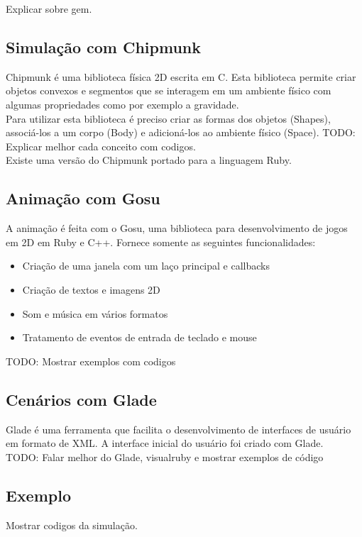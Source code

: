 Explicar sobre gem.

\subsection{Simulação com Chipmunk}
Chipmunk é uma biblioteca física 2D escrita em C. Esta biblioteca permite criar objetos convexos e segmentos que se interagem em um ambiente físico com algumas propriedades 
como por exemplo a gravidade. \\

Para utilizar esta biblioteca é preciso criar as formas dos objetos (Shapes), associá-los a um corpo (Body) e adicioná-los ao ambiente físico (Space).
TODO: Explicar melhor cada conceito com codigos. \\

Existe uma versão do Chipmunk portado para a linguagem Ruby.

\subsection{Animação com Gosu}
A animação é feita com o Gosu, uma biblioteca para desenvolvimento de jogos em 2D em Ruby e C++. Fornece somente as seguintes funcionalidades:

\begin{itemize}
  \item Criação de uma janela com um laço principal e callbacks
  \item Criação de textos e imagens 2D
  \item Som e música em vários formatos
  \item Tratamento de eventos de entrada de teclado e mouse
\end{itemize}

TODO: Mostrar exemplos com codigos

\subsection{Cenários com Glade}
Glade é uma ferramenta que facilita o desenvolvimento de interfaces de usuário em formato de XML. A interface inicial do usuário foi criado com Glade.\\

TODO: Falar melhor do Glade, visualruby e mostrar exemplos de código
\subsection{Exemplo}

Mostrar codigos da simulação.
